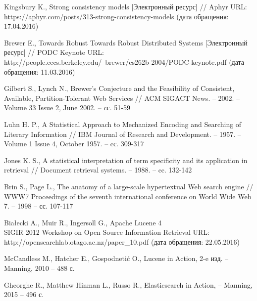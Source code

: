 \begingroup 
{}
\begin{thebibliography}{00}

	Kingsbury K., Strong consistency models
	[Электронный ресурс] //
	Aphyr
	URL: https://aphyr.com/posts/313-strong-consistency-models
	(дата обращения: 17.04.2016)
	
	Brewer E., Towards Robust Towards Robust Distributed Systems
	[Электронный ресурс] //
	PODC Keynote
	URL: http://people.eecs.berkeley.edu/~brewer/cs262b-2004/PODC-keynote.pdf
	(дата обращения: 11.03.2016)
	
	Gilbert S., Lynch N., Brewer’s Conjecture and the Feasibility of Consistent, Available, Partition-Tolerant Web Services //
	ACM SIGACT News. -- 2002. -- Volume 33 Issue 2, June 2002. -- cс. 51-59
	
	Luhn H. P., A Statistical Approach to Mechanized Encoding and Searching of Literary Information //
	IBM Journal of Research and Development. -- 1957. -- Volume 1 Issue 4, October 1957. -- cс. 309-317
	
	Jones K. S., A statistical interpretation of term specificity and its application in retrieval //
	Document retrieval systems. -- 1988. -- cc. 132-142
	
	Brin S., Page L., The anatomy of a large-scale hypertextual Web search engine //
	WWW7 Proceedings of the seventh international conference on World Wide Web 7. -- 1998 -- сс. 107-117

	Białecki A., Muir R., Ingersoll G., Apache Lucene 4 \\
	SIGIR 2012 Workshop on Open Source Information Retrieval
	URL: http://opensearchlab.otago.ac.nz/paper\_10.pdf
	(дата обращения: 22.05.2016)
	
	McCandless M., Hatcher E., Gospodnetić O., Lucene in Action,
	2-e изд. -- Manning, 2010 -- 488 с.
	
	Gheorghe R., Matthew Hinman L., Russo R., Elasticsearch in Action, -- Manning, 2015 -- 496 с.

\end{thebibliography}
\endgroup

\clearpage
